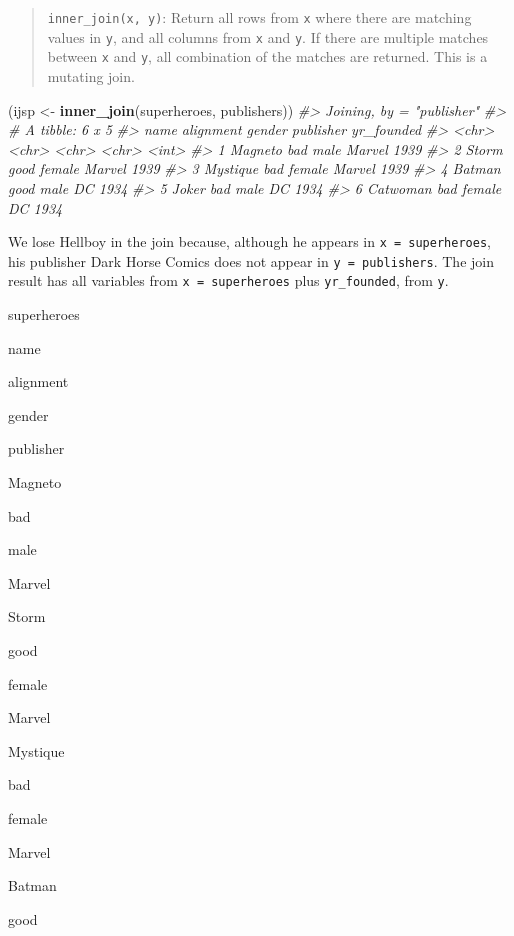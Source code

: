 \documentclass[
]{book}
\newenvironment{Shaded}{\begin{snugshade}}{\end{snugshade}}
\newcommand{\CommentTok}[1]{\textcolor[rgb]{0.56,0.35,0.01}{\textit{#1}}}
\newcommand{\KeywordTok}[1]{\textcolor[rgb]{0.13,0.29,0.53}{\textbf{#1}}}
\newcommand{\NormalTok}[1]{#1}
\newcommand{\StringTok}[1]{\textcolor[rgb]{0.31,0.60,0.02}{#1}}
\begin{document}
\begin{quote}
\texttt{inner\_join(x,\ y)}: Return all rows from \texttt{x} where there are matching values in \texttt{y}, and all columns from \texttt{x} and \texttt{y}. If there are multiple matches between \texttt{x} and \texttt{y}, all combination of the matches are returned. This is a mutating join.
\end{quote}

\begin{Shaded}
\begin{Highlighting}[]
\NormalTok{(ijsp <-}\StringTok{ }\KeywordTok{inner_join}\NormalTok{(superheroes, publishers))}
\CommentTok{#> Joining, by = "publisher"}
\CommentTok{#> # A tibble: 6 x 5}
\CommentTok{#>   name     alignment gender publisher yr_founded}
\CommentTok{#>   <chr>    <chr>     <chr>  <chr>          <int>}
\CommentTok{#> 1 Magneto  bad       male   Marvel          1939}
\CommentTok{#> 2 Storm    good      female Marvel          1939}
\CommentTok{#> 3 Mystique bad       female Marvel          1939}
\CommentTok{#> 4 Batman   good      male   DC              1934}
\CommentTok{#> 5 Joker    bad       male   DC              1934}
\CommentTok{#> 6 Catwoman bad       female DC              1934}
\end{Highlighting}
\end{Shaded}

We lose Hellboy in the join because, although he appears in \texttt{x\ =\ superheroes}, his publisher Dark Horse Comics does not appear in \texttt{y\ =\ publishers}. The join result has all variables from \texttt{x\ =\ superheroes} plus \texttt{yr\_founded}, from \texttt{y}.

superheroes

name

alignment

gender

publisher

Magneto

bad

male

Marvel

Storm

good

female

Marvel

Mystique

bad

female

Marvel

Batman

good
\end{document}
